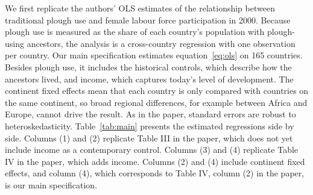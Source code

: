 \documentclass[12pt,a4paper]{article}
\newif\ifshowinstr
\newcommand{\instr}[1]{\ifshowinstr{\leavevmode\color{gray}\itshape\small [#1]\par}\fi}
\renewcommand{\arraystretch}{1.25}
\begin{document}
\instr{This part should include your main replication table (Table~\ref{tab:main}) and figure(s) (at least Figure~\ref{fig:main}). Replicate at least what you consider the main column of the main results table, as well as one or two figures that visualize the result. Do your results differ? Worksheet~A.3 helps you think about why they might differ. It is fine if you cannot replicate a number exactly, as long as you understand why.}

We first replicate the authors' OLS estimates of the relationship between traditional plough use and female labour force participation in 2000. Because plough use is measured as the share of each country's population with plough-using ancestors, the analysis is a cross-country regression with one observation per country. Our main specification estimates equation~\eqref{eq:ols} on 165 countries. Besides plough use, it includes the historical controls, which describe how the ancestors lived, and income, which captures today's level of development. The continent fixed effects mean that each country is only compared with countries on the same continent, so broad regional differences, for example between Africa and Europe, cannot drive the result. As in the paper, standard errors are robust to heteroskedasticity. Table~\ref{tab:main} presents the estimated regressions side by side. Columns (1) and (2) replicate Table III in the paper, which does not yet include income as a contemporary control. Columns (3) and (4) replicate Table IV in the paper, which adds income. Columns (2) and (4) include continent fixed effects, and column (4), which corresponds to Table IV, column (2) in the paper, is our main specification.

\begin{table}[H]
  \centering
  \vspace{-4pt}
  \caption{Country-level OLS estimates of female labour force participation in 2000 (replication of Tables III and IV)}
  \label{tab:main}
  \small
  \renewcommand{\arraystretch}{1}
  \setlength{\tabcolsep}{11.5pt}
  
\end{table}
\end{document}
